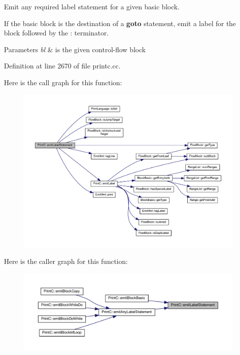 Emit any required label statement for a given basic block. 

If the basic block is the destination of a {\bfseries{goto}} statement, emit a label for the block followed by the \textquotesingle{}\+:\textquotesingle{} terminator. 
\begin{DoxyParams}{Parameters}
{\em bl} & is the given control-\/flow block \\
\hline
\end{DoxyParams}


Definition at line 2670 of file printc.\+cc.

Here is the call graph for this function\+:
\nopagebreak
\begin{figure}[H]
\begin{center}
\leavevmode
\includegraphics[width=350pt]{class_print_c_ad237ae57af8296e4575fd083972c5b21_cgraph}
\end{center}
\end{figure}
Here is the caller graph for this function\+:
\nopagebreak
\begin{figure}[H]
\begin{center}
\leavevmode
\includegraphics[width=350pt]{class_print_c_ad237ae57af8296e4575fd083972c5b21_icgraph}
\end{center}
\end{figure}
\mbox{\label{class_print_c_a344e10d6f5f8b2b2fda6dc627e1b3c94}} 
